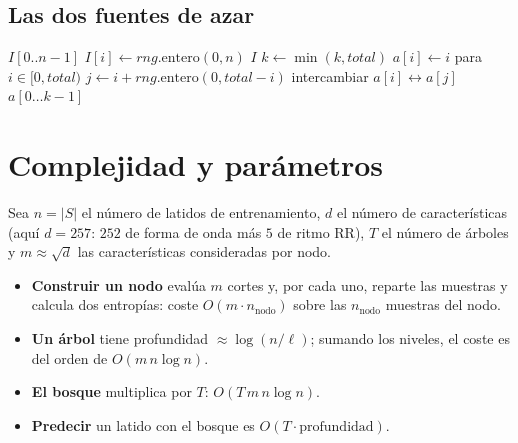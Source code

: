 \documentclass[11pt,a4paper]{article}
\begin{document}
\subsection{Las dos fuentes de azar}

\begin{algorithm}[h]
\caption{Muestreo aleatorio del bosque}
\begin{algorithmic}[1]
  \Comment{$n$ índices en $[0,n)$ al azar \textbf{con} reemplazo}
  \State $I[0..n-1]$
     \State $I[i] \gets \mathit{rng}.\text{entero}(0, n)$
  \EndFor
  \State \Return $I$
\EndFunction
\Statex
{}
  \Comment{$k$ índices \textbf{distintos} de $[0,\mathit{total})$: Fisher--Yates parcial}
  \State $k \gets \min(k, \mathit{total})$
  \State $a[i] \gets i$ para $i \in [0, \mathit{total})$
     \State $j \gets i + \mathit{rng}.\text{entero}(0, \mathit{total}-i)$
     \State intercambiar $a[i] \leftrightarrow a[j]$
  \EndFor
  \State \Return $a[0 \ldots k-1]$
\EndFunction
\end{algorithmic}
\end{algorithm}

\section{Complejidad y parámetros}

Sea $n = |S|$ el número de latidos de entrenamiento, $d$ el número de características
(aquí $d = 257$: $252$ de forma de onda más $5$ de ritmo RR), $T$ el número de árboles y
$m \approx \sqrt{d}$ las características consideradas por nodo.

\begin{itemize}
  \item \textbf{Construir un nodo} evalúa $m$ cortes y, por cada uno, reparte las muestras y
        calcula dos entropías: coste $O(m \cdot n_{\text{nodo}})$ sobre las $n_{\text{nodo}}$
        muestras del nodo.
  \item \textbf{Un árbol} tiene profundidad $\approx \log(n/\ell)$; sumando los niveles, el
        coste es del orden de $O(m \, n \log n)$.
  \item \textbf{El bosque} multiplica por $T$: $O(T \, m \, n \log n)$.
  \item \textbf{Predecir} un latido con el bosque es $O(T \cdot \text{profundidad})$.
\end{itemize}
\end{document}
